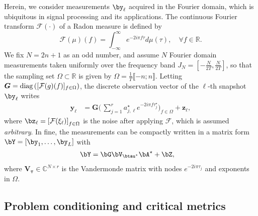 \documentclass[conference,english]{IEEEtran}
\begin{document}
Herein, we consider measurements $\by_\ell$ acquired in the Fourier domain, which is ubiquitous in signal processing and its applications. The continuous Fourier transform $\mathcal{F}(\cdot)$ of a Radon measure is defined by
\begin{equation*}
    \mathcal{F}(\mu)(f) = \int_{-\infty}^\infty  e^{-2 i \pi f \tau } d \mu(\tau),  \quad \forall f \in \mathbb{R}.
\end{equation*}
We fix ${N} = 2{n}+1$ as an odd number, and assume ${N}$ Fourier domain measurements taken uniformly over the frequency band $J_N = [-\tfrac{N}{2T},\tfrac{N}{2T}]$, so that the sampling set ${\Omega} \subset \mathbb{R}$ is given by ${\Omega} = \tfrac{1}{{T}}{\llbracket-{n}; {n}\rrbracket}$.
Letting  $\bm{G} = \operatorname{diag} \left([\mathcal{F}(g)(f)]_{f \in \Omega}\right)$, the discrete observation vector of the $\ell$-th snapshot $\by_\ell$ writes
\begin{align*}
     \bm{y}_\ell
     &= \bm{G} \Big( \,\sum_{j=1}^r a_{j,\ell}^\star e^{-2i\pi f \tau_j^\star} \Big)_{f \in \Omega}
     + \bm{z}_\ell,
\end{align*}
where $\bz_\ell = {[\mathcal{F}(\xi_\ell)]}_{f\in\Omega}$ is the noise after applying $\mathcal{F}$, which is assumed \emph{arbitrary}. In fine, the measurements can be compactly written in a matrix form  $\bY = \left[\by_1, \dots, \by_L \right]$ with
\begin{align}\label{eq:observation_model}
    \bY &= \bG \bV_{\btau^\star} \bA^\star + \bZ,
\end{align}
where $\bm{V}_{\bm{\tau}} \in \mathbb{C}^{N \times r}$ is the Vandermonde matrix with nodes $e^{-2i \pi \tau_j}$ and exponents in $\Omega$.

\subsection{Problem conditioning and critical metrics}\label{subsec:metrics}
\end{document}
